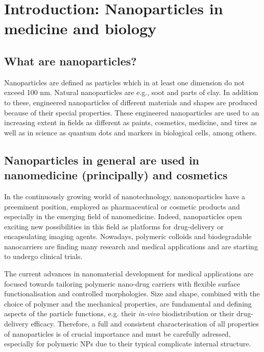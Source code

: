 \chapter{Introduction: Nanoparticles in medicine and biology}
\label{chap:introduction}

\section{What are nanoparticles?}

Nanoparticles are defined as particles which in at least one dimension do not exceed 100 nm. Natural nanoparticles are e.g., soot and parts of clay. In addition to these, engineered nanoparticles of different materials and shapes are produced because of their special properties. These engineered nanoparticles are used to an increasing extent in fields as different as paints, cosmetics, medicine, and tires as well as in science as quantum dots and markers in biological cells, among others.

\section{Nanoparticles in general are used in nanomedicine (principally) and cosmetics}

In the continuously growing world of nanotechnology, nanonoparticles have a preeminent position, employed as pharmaceutical or cosmetic products\citep{guterres_polymeric_2007} and especially in the emerging field of nanomedicine. Indeed, nanoparticles open exciting new possibilities in this field as platforms for drug-delivery\citep{wang_nanoparticle_2012} or encapsulating imaging agents\citep{tao_shape-specific_2011}. Nowadays, polymeric colloids and biodegradable nanocarriers are finding many research and medical applications\citep{vicent_polymer_2006} and are starting to undergo clinical trials\citep{patel_polymeric_2012,beija_colloidal_2012,cabral_progress_2014}.

The current advances in nanomaterial development for medical applications are focused towards tailoring polymeric nano-drug carriers with flexible surface functionalisation and controlled morphologies\citep{euliss_imparting_2006,yang_shape-memory_2005}. Size and shape, combined with the choice of polymer and the mechanical properties, are fundamental and defining aspects of the particle functions, e.g. their \emph{in-vivo} biodistribution\citep{vittaz_effect_1996,mitragotri_physical_2009,doshi_designer_2009} or their drug-delivery efficacy\citep{powers_research_2006}. Therefore, a full and consistent characterisation of all properties of nanoparticles is of crucial importance and must be carefully adressed, especially for polymeric NPs due to their typical complicate internal structure.

